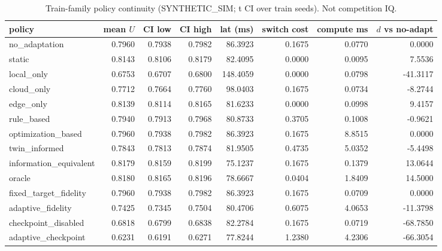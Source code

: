\begin{table}[h]\centering
\caption{Train-family policy continuity (SYNTHETIC\_SIM; t CI over train seeds). Not competition IQ.}
\begin{tabular}{lrrrrrrr}\toprule
policy & mean $U$ & CI low & CI high & lat (ms) & switch cost & compute ms & $d$ vs no-adapt \\
\midrule
no\_adaptation & 0.7960 & 0.7938 & 0.7982 & 86.3923 & 0.1675 & 0.0770 & 0.0000 \\
static & 0.8143 & 0.8106 & 0.8179 & 82.4095 & 0.0000 & 0.0095 & 7.5536 \\
local\_only & 0.6753 & 0.6707 & 0.6800 & 148.4059 & 0.0000 & 0.0798 & -41.3117 \\
cloud\_only & 0.7712 & 0.7664 & 0.7760 & 98.0403 & 0.1675 & 0.0734 & -8.2744 \\
edge\_only & 0.8139 & 0.8114 & 0.8165 & 81.6233 & 0.0000 & 0.0998 & 9.4157 \\
rule\_based & 0.7940 & 0.7913 & 0.7968 & 80.8733 & 0.3705 & 0.1008 & -0.9621 \\
optimization\_based & 0.7960 & 0.7938 & 0.7982 & 86.3923 & 0.1675 & 8.8515 & 0.0000 \\
twin\_informed & 0.7843 & 0.7813 & 0.7874 & 81.9505 & 0.4735 & 5.0352 & -5.4498 \\
information\_equivalent & 0.8179 & 0.8159 & 0.8199 & 75.1237 & 0.1675 & 0.1379 & 13.0644 \\
oracle & 0.8180 & 0.8165 & 0.8196 & 78.6667 & 0.0404 & 1.8409 & 14.5000 \\
fixed\_target\_fidelity & 0.7960 & 0.7938 & 0.7982 & 86.3923 & 0.1675 & 0.0709 & 0.0000 \\
adaptive\_fidelity & 0.7425 & 0.7345 & 0.7504 & 80.4706 & 0.6075 & 4.0653 & -11.3798 \\
checkpoint\_disabled & 0.6818 & 0.6799 & 0.6838 & 82.2784 & 0.1675 & 0.0719 & -68.7850 \\
adaptive\_checkpoint & 0.6231 & 0.6191 & 0.6271 & 77.8244 & 1.2380 & 4.2306 & -66.3054 \\
\bottomrule\end{tabular}
\end{table}
